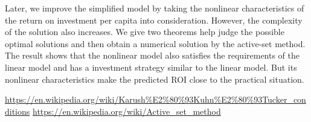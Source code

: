 \documentclass{mcmthesis}
\begin{document}
Later, we improve the simplified model by taking the nonlinear characteristics of the return on investment per capita into consideration. However, the complexity of the solution also increases. We give two theorems help judge the possible optimal solutions and then obtain a numerical solution by the active-set method. The result shows that the nonlinear model also satisfies the requirements of the linear model and has a investment strategy similar to the linear model. But its nonlinear characteristics make the predicted ROI close to the practical situation.

\begin{thebibliography}{99}

\url{https://en.wikipedia.org/wiki/Karush\%E2\%80\%93Kuhn\%E2\%80\%93Tucker_conditions}
\url{https://en.wikipedia.org/wiki/Active_set_method}
\end{thebibliography}
\end{document}
